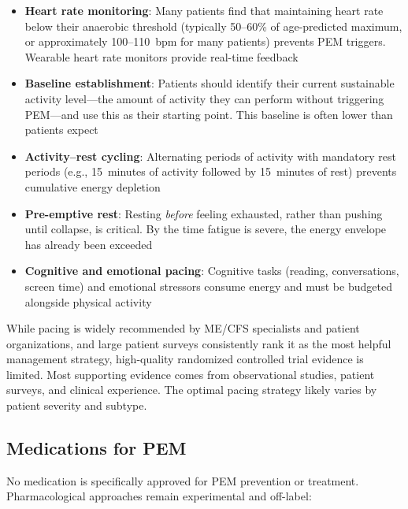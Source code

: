 \begin{itemize}
    \item \textbf{Heart rate monitoring}: Many patients find that maintaining heart rate below their anaerobic threshold (typically 50--60\% of age-predicted maximum, or approximately 100--110~bpm for many patients) prevents PEM triggers. Wearable heart rate monitors provide real-time feedback
    \item \textbf{Baseline establishment}: Patients should identify their current sustainable activity level---the amount of activity they can perform without triggering PEM---and use this as their starting point. This baseline is often lower than patients expect
    \item \textbf{Activity--rest cycling}: Alternating periods of activity with mandatory rest periods (e.g., 15~minutes of activity followed by 15~minutes of rest) prevents cumulative energy depletion
    \item \textbf{Pre-emptive rest}: Resting \textit{before} feeling exhausted, rather than pushing until collapse, is critical. By the time fatigue is severe, the energy envelope has already been exceeded
    \item \textbf{Cognitive and emotional pacing}: Cognitive tasks (reading, conversations, screen time) and emotional stressors consume energy and must be budgeted alongside physical activity
\end{itemize}

\begin{limitation}
While pacing is widely recommended by ME/CFS specialists and patient organizations, and large patient surveys consistently rank it as the most helpful management strategy, high-quality randomized controlled trial evidence is limited. Most supporting evidence comes from observational studies, patient surveys, and clinical experience. The optimal pacing strategy likely varies by patient severity and subtype.
\end{limitation}

\subsection{Medications for PEM}

No medication is specifically approved for PEM prevention or treatment. Pharmacological approaches remain experimental and off-label:

